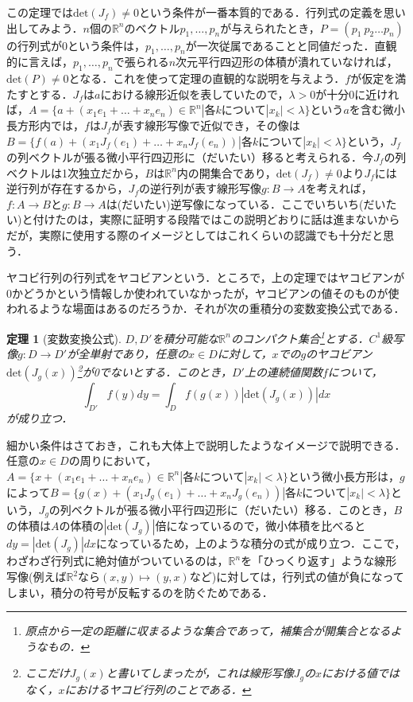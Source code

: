 \documentclass{jsarticle}
\def\realnum{{\mathbb R}}
\def\det{{\mathrm{det}}}
\newtheorem{theo}{定理}
\begin{document}
この定理では$\det(J_f)\neq 0$という条件が一番本質的である．行列式の定義を思い出してみよう．$n$個の$\realnum^n$のベクトル$p_1,\dots,p_n$が与えられたとき，$P=(p_1\: p_2\dots p_n)$の行列式が0という条件は，$p_1,\dots,p_n$が一次従属であることと同値だった．直観的に言えば，$p_1,\dots,p_n$で張られる$n$次元平行四辺形の体積が潰れていなければ，$\det(P)\neq 0$となる．これを使って定理の直観的な説明を与えよう．$f$が仮定を満たすとする．$J_f$は$a$における線形近似を表していたので，$\lambda>0$が十分0に近ければ，$A=\{a+(x_1e_1+\dots+x_ne_n)\in\realnum^n|各kについて|x_k|<\lambda\}$という$a$を含む微小長方形内では，$f$は$J_f$が表す線形写像で近似でき，その像は$B=\{f(a)+(x_1J_f(e_1)+\dots +x_nJ_f(e_n))|各kについて|x_k|<\lambda\}$という，$J_f$の列ベクトルが張る微小平行四辺形に（だいたい）移ると考えられる．今$J_f$の列ベクトルは1次独立だから，$B$は$\realnum^n$内の開集合であり，$\det(J_f)\neq 0$より$J_f$には逆行列が存在するから，$J_f$の逆行列が表す線形写像$g:B\rightarrow A$を考えれば，$f:A\rightarrow B$と$g:B\rightarrow A$は(だいたい)逆写像になっている．ここでいちいち(だいたい)と付けたのは，実際に証明する段階ではこの説明どおりに話は進まないからだが，実際に使用する際のイメージとしてはこれくらいの認識でも十分だと思う．


ヤコビ行列の行列式をヤコビアンという．ところで，上の定理ではヤコビアンが0かどうかという情報しか使われていなかったが，ヤコビアンの値そのものが使われるような場面はあるのだろうか．それが次の重積分の変数変換公式である．
\begin{theo}[変数変換公式]
$D,D'$を積分可能な$\realnum^n$のコンパクト集合\footnote{原点から一定の距離に収まるような集合であって，補集合が開集合となるようなもの．}とする．$C^1$級写像$g:D\rightarrow D'$が全単射であり，任意の$x\in D$に対して，$x$での$g$のヤコビアン$\det(J_g(x))$\footnote{ここだけ$J_g(x)$と書いてしまったが，これは線形写像$J_g$の$x$における値ではなく，$x$におけるヤコビ行列のことである．}が0でないとする．このとき，$D'$上の連続値関数$f$について，
$$
\int_{D'}f(y)dy=\int_Df(g(x))|\det(J_g(x))|dx
$$
が成り立つ．
\end{theo}
細かい条件はさておき，これも大体上で説明したようなイメージで説明できる．任意の$x\in D$の周りにおいて，$A=\{x+(x_1e_1+\dots+x_ne_n)\in\realnum^n|各kについて|x_k|<\lambda\}$という微小長方形は，$g$によって$B=\{g(x)+(x_1J_g(e_1)+\dots +x_nJ_g(e_n))|各kについて|x_k|<\lambda\}$という，$J_g$の列ベクトルが張る微小平行四辺形に（だいたい）移る．このとき，$B$の体積は$A$の体積の$|\det(J_g)|$倍になっているので，微小体積を比べると$dy=|\det(J_g)|dx$になっているため，上のような積分の式が成り立つ．ここで，わざわざ行列式に絶対値がついているのは，$\realnum^n$を「ひっくり返す」ような線形写像(例えば$\realnum^2$なら$(x,y)\mapsto (y,x)$など)に対しては，行列式の値が負になってしまい，積分の符号が反転するのを防ぐためである．
\end{document}
